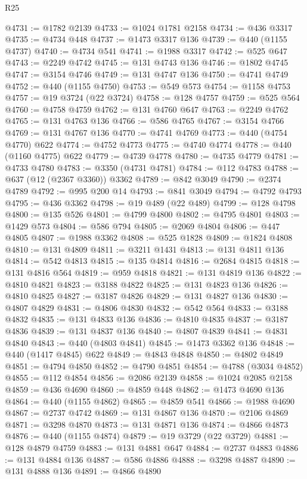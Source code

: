 \begin{lexlean}{R25}
\begin{coremodule}
@4731 := @1782 @2139
@4733 := @1024 @1781 @2158
@4734 := @436 @3317
@4735 := @4734 @448
@4737 := @1473 @3317 @136
@4739 := @440 (@1155 @4737)
@4740 := @4734 @541
@4741 := @1988 @3317
@4742 := @525 @647
@4743 := @2249 @4742
@4745 := @131 @4743 @136
@4746 := @1802 @4745
@4747 := @3154 @4746
@4749 := @131 @4747 @136
@4750 := @4741 @4749
@4752 := @440 (@1155 @4750)
@4753 := @549 @573
@4754 := @1158 @4753
@4757 := @19 @3724 (@22 @3724)
@4758 := @128 @4757
@4759 := @525 @564
@4760 := @4758 @4759
@4762 := @131 @4760 @647
@4763 := @2249 @4762
@4765 := @131 @4763 @136
@4766 := @586 @4765
@4767 := @3154 @4766
@4769 := @131 @4767 @136
@4770 := @4741 @4769
@4773 := @440 (@4754 @4770) @622
@4774 := @4752 @4773
@4775 := @4740 @4774
@4778 := @440 (@1160 @4775) @622
@4779 := @4739 @4778
@4780 := @4735 @4779
@4781 := @4733 @4780
@4783 := @3350 (@4731 @4781)
@4784 := @112 @4783
@4788 := @637 (@12 (@2367 @3360)) @3362
@4789 := @842 @3049
@4790 := @2374 @4789
@4792 := @995 @200 @14
@4793 := @841 @3049
@4794 := @4792 @4793
@4795 := @436 @3362
@4798 := @19 @489 (@22 @489)
@4799 := @128 @4798
@4800 := @135 @526
@4801 := @4799 @4800
@4802 := @4795 @4801
@4803 := @1429 @573
@4804 := @586 @794
@4805 := @2069 @4804
@4806 := @447 @4805
@4807 := @1988 @3362
@4808 := @525 @1828
@4809 := @1824 @4808
@4810 := @131 @4809
@4811 := @3211 @1431
@4813 := @131 @4811 @136
@4814 := @542 @4813
@4815 := @135 @4814
@4816 := @2684 @4815
@4818 := @131 @4816 @564
@4819 := @959 @4818
@4821 := @131 @4819 @136
@4822 := @4810 @4821
@4823 := @3188 @4822
@4825 := @131 @4823 @136
@4826 := @4810 @4825
@4827 := @3187 @4826
@4829 := @131 @4827 @136
@4830 := @4807 @4829
@4831 := @4806 @4830
@4832 := @542 @564
@4833 := @3188 @4832
@4835 := @131 @4833 @136
@4836 := @4810 @4835
@4837 := @3187 @4836
@4839 := @131 @4837 @136
@4840 := @4807 @4839
@4841 := @4831 @4840
@4843 := @440 (@4803 @4841)
@4845 := @1473 @3362 @136
@4848 := @440 (@1417 @4845) @622
@4849 := @4843 @4848
@4850 := @4802 @4849
@4851 := @4794 @4850
@4852 := @4790 @4851
@4854 := @4788 (@3034 @4852)
@4855 := @112 @4854
@4856 := @2086 @2139
@4858 := @1024 @2085 @2158
@4859 := @436 @4690
@4860 := @4859 @448
@4862 := @1473 @4690 @136
@4864 := @440 (@1155 @4862)
@4865 := @4859 @541
@4866 := @1988 @4690
@4867 := @2737 @4742
@4869 := @131 @4867 @136
@4870 := @2106 @4869
@4871 := @3298 @4870
@4873 := @131 @4871 @136
@4874 := @4866 @4873
@4876 := @440 (@1155 @4874)
@4879 := @19 @3729 (@22 @3729)
@4881 := @128 @4879 @4759
@4883 := @131 @4881 @647
@4884 := @2737 @4883
@4886 := @131 @4884 @136
@4887 := @586 @4886
@4888 := @3298 @4887
@4890 := @131 @4888 @136
@4891 := @4866 @4890

\end{coremodule}
\end{lexlean}
